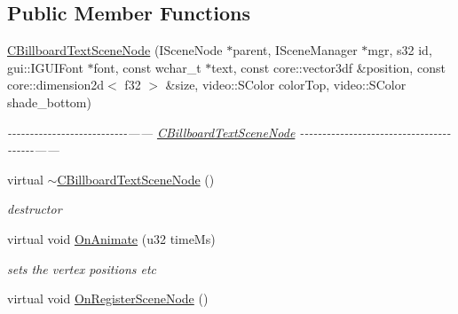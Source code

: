 \subsection*{Public Member Functions}
\begin{DoxyCompactItemize}
\item 
\hyperlink{classirr_1_1scene_1_1_c_billboard_text_scene_node_a1895e96ca5d8485106e024eb4366a836}{C\-Billboard\-Text\-Scene\-Node} (I\-Scene\-Node $\ast$parent, I\-Scene\-Manager $\ast$mgr, s32 id, gui\-::\-I\-G\-U\-I\-Font $\ast$font, const wchar\-\_\-t $\ast$text, const core\-::vector3df \&position, const core\-::dimension2d$<$ f32 $>$ \&size, video\-::\-S\-Color color\-Top, video\-::\-S\-Color shade\-\_\-bottom)
\begin{DoxyCompactList}\small\item\em -\/-\/-\/-\/-\/-\/-\/-\/-\/-\/-\/-\/-\/-\/-\/-\/-\/-\/-\/-\/-\/-\/-\/-\/-\/-\/-\/------ \hyperlink{classirr_1_1scene_1_1_c_billboard_text_scene_node}{C\-Billboard\-Text\-Scene\-Node} -\/-\/-\/-\/-\/-\/-\/-\/-\/-\/-\/-\/-\/-\/-\/-\/-\/-\/-\/-\/-\/-\/-\/-\/-\/-\/-\/-\/-\/-\/-\/-\/-\/-\/-\/-\/-\/-\/-\/-\/------ \end{DoxyCompactList}\item 
\hypertarget{classirr_1_1scene_1_1_c_billboard_text_scene_node_a3d9eccdf0b27cde66e9da8cb20c461e5}{virtual \hyperlink{classirr_1_1scene_1_1_c_billboard_text_scene_node_a3d9eccdf0b27cde66e9da8cb20c461e5}{$\sim$\-C\-Billboard\-Text\-Scene\-Node} ()}\label{classirr_1_1scene_1_1_c_billboard_text_scene_node_a3d9eccdf0b27cde66e9da8cb20c461e5}

\begin{DoxyCompactList}\small\item\em destructor \end{DoxyCompactList}\item 
virtual void \hyperlink{classirr_1_1scene_1_1_c_billboard_text_scene_node_acc816a8fc0977544c246a1fa47c37155}{On\-Animate} (u32 time\-Ms)
\begin{DoxyCompactList}\small\item\em sets the vertex positions etc \end{DoxyCompactList}\item 
\hypertarget{classirr_1_1scene_1_1_c_billboard_text_scene_node_aab6bbd04c968369e2fa4125d53a1f702}{virtual void \hyperlink{classirr_1_1scene_1_1_c_billboard_text_scene_node_aab6bbd04c968369e2fa4125d53a1f702}{On\-Register\-Scene\-Node} ()}\label{classirr_1_1scene_1_1_c_billboard_text_scene_node_aab6bbd04c968369e2fa4125d53a1f702}


\end{DoxyCompactItemize}
